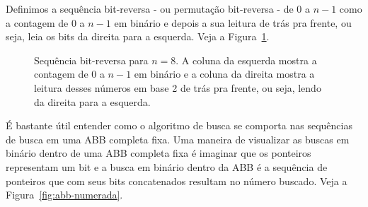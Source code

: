 Definimos a sequência bit-reversa - ou permutação bit-reversa - de $0$ a $n-1$ como a contagem de $0$ a $n-1$ em binário e depois a sua leitura de trás pra frente, ou seja, leia os bits da direita para a esquerda. Veja a Figura~\ref{fig:sequencia}.

\begin{figure}
    \caption{Sequência bit-reversa para $n = 8$. A coluna da esquerda mostra a contagem de $0$ a $n - 1$ em binário e a  coluna da direita mostra a leitura desses números em base 2 de trás pra frente, ou seja, lendo da direita para a esquerda.}
\label{fig:sequencia}
\end{figure}

É bastante útil entender como o algoritmo de busca se comporta nas sequências de busca em uma ABB completa fixa. Uma maneira de visualizar as buscas em binário dentro de uma ABB completa fixa é imaginar que os ponteiros representam um bit e a busca em binário dentro da ABB é a sequência de ponteiros que com seus bits concatenados resultam no número buscado. Veja a Figura~\ref{fig:abb-numerada}.

